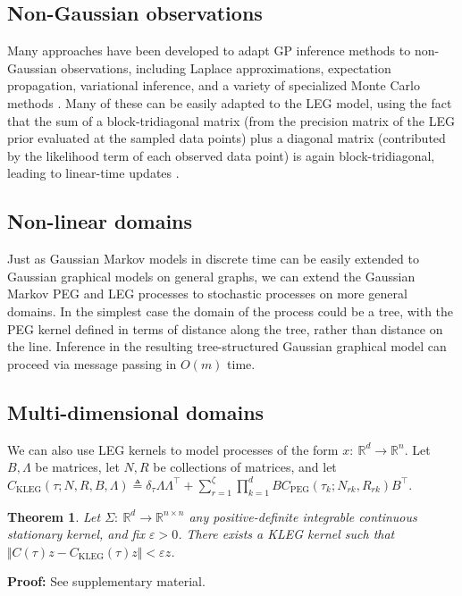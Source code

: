 \documentclass{article}
\newtheorem{theorem}{Theorem}
\theoremstyle{definition}
\newcommand{\PEG}{\mathrm{PEG}}
\newcommand{\KLEG}{\mathrm{KLEG}}
\begin{document}
\subsection{Non-Gaussian observations}  
Many approaches have been developed to adapt GP inference methods to non-Gaussian observations, including Laplace approximations, expectation propagation, variational inference, and a variety of specialized Monte Carlo methods \cite{hartikainen2011sparse,riihimaki2014laplace,nguyen2014automated,nishihara2014parallel}.  Many of these can be easily adapted to the LEG model, using the fact that the sum of a block-tridiagonal matrix (from the precision matrix of the  LEG prior evaluated at the sampled data points) plus a diagonal matrix (contributed by the likelihood term of each observed data point) is again block-tridiagonal, leading to linear-time updates \cite{smith2003estimating,Paninski2010,fahrmeir2013multivariate,polson2013bayesian,Khan,Nickisch}.


\subsection{Non-linear domains}
Just as Gaussian Markov models in discrete time can be easily extended to Gaussian graphical models on general graphs, we can extend the Gaussian Markov PEG and LEG processes to stochastic processes on more general domains.  In the simplest case the domain of the process could be a tree, with the PEG kernel defined in terms of distance along the tree, rather than distance on the line.  Inference in the resulting tree-structured Gaussian graphical model can proceed via message passing in $O(m)$ time.

\subsection{Multi-dimensional domains}
We can also use LEG kernels to model processes of the form $x:\ \mathbb{R}^d\rightarrow\mathbb{R}^n$.  Let $B,\Lambda$ be matrices, let $N,R$ be collections of matrices, and let $C_\KLEG(\tau;N,R,B,\Lambda) \triangleq \delta_\tau \Lambda \Lambda^\top+ \sum_{r=1}^{\zeta} \prod_{k=1}^d B C_\PEG(\tau_k;N_{rk},R_{rk})B^\top$.   
\begin{theorem}
Let $\Sigma:\ \mathbb{R}^d \rightarrow \mathbb{R}^{n \times n} $ any positive-definite integrable continuous stationary kernel, and fix $\varepsilon>0$.  There exists a KLEG kernel such that $\Vert C(\tau)z-C_\KLEG(\tau)z\Vert < \varepsilon z$. 
\end{theorem}
{\bf Proof:} See supplementary material.  
\end{document}
